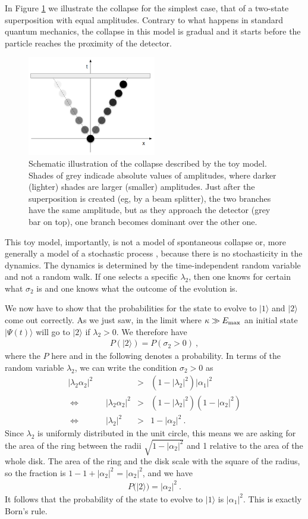 \documentclass[12pt]{article}
\def\beqn{\begin{eqnarray}}
\def\eeqn{\end{eqnarray}}
\begin{document}
In Figure \ref{figcollapse} we illustrate the collapse for the simplest case, that of a two-state superposition with equal amplitudes. Contrary to what happens in standard quantum mechanics, the collapse in this model is gradual and it starts before the particle reaches the proximity of the detector. 
\begin{figure}[h]
\centering
\includegraphics[width=0.5\textwidth]{collapse.png}
\caption{Schematic illustration of the collapse described by the toy model. Shades of grey indicade absolute values of amplitudes, where darker (lighter) shades are larger (smaller) amplitudes. Just after the superposition is created (eg, by a beam splitter), the two branches have the same amplitude, but as they approach the detector (grey bar on top), one branch becomes dominant over the other one.}
\label{figcollapse}
\end{figure}
This toy model, importantly, is not a model of spontaneous collapse \cite{Bassi:2003gd} or, more generally a model of a stochastic process \cite{stochastic}, because there is no stochasticity in the dynamics. The dynamics is determined by the time-independent random variable and not a random walk. If one selects a specific $\lambda_2$, then one knows for certain what $\sigma_2$ is and one knows what the outcome of the evolution is. 

We now have to show that the probabilities for the state to evolve to $|1 \rangle$ and $|2 \rangle$ come out correctly. As we just saw, in the limit where $\kappa \gg E_{\rm max}$  an initial state $|\Psi(t) \rangle$ will go to $|2 \rangle$ if $\lambda_2 > 0$. We therefore have
\beqn
P( |2 \rangle ) = P (\sigma_2 > 0)~,
\eeqn
where the $P$ here and in the following denotes a probability.
In terms of the random variable $\lambda_2$, we can write the condition $\sigma_2 > 0$ as
\beqn
| \lambda_2 \alpha_2 |^2 &>& (1 -  | \lambda_2|^2)  |\alpha_1|^2  \nonumber\\
\Leftrightarrow \quad \quad \quad  |  \lambda_2 \alpha_2 |^2 &>& (1 -  |\lambda_2|^2) (1- |\alpha_2|^2 ) \nonumber\\
\Leftrightarrow \quad \quad \quad | \lambda_2|^2 &>& 1- |\alpha_2|^2~. \label{prob}
\eeqn
Since $ \lambda_2$ is uniformly distributed in the unit circle, this means we are asking for the area of the ring between the radii $\sqrt{1- |\alpha_2|^2}$  and 1 relative to
the area of the whole disk. The area of the ring and the disk scale with the square of the radius, so the fraction is $1-1+|\alpha_2|^2$ = $|\alpha_2|^2$, and we have
\beqn
P(|2 \rangle) = |\alpha_2|^2~.
\eeqn
 It follows that the probability of the state to evolve to $|1 \rangle$ is $|\alpha_1|^2$. This is exactly Born's rule. 
 
\end{document}

